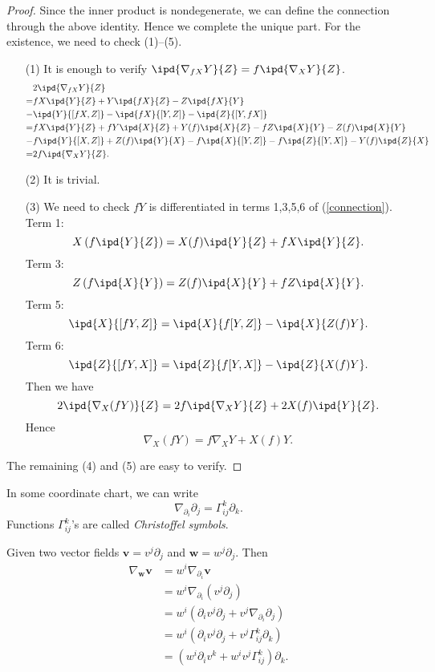 \begin{proof}
  Since the inner product is nondegenerate, we can define the connection through the above identity. Hence we complete the unique part. For the existence, we need to check (1)--(5). 
  \begin{itemize}
    \item [(1)] It is enough to verify $\ipd{\nabla _{fX}Y}{Z}=f\ipd{\nabla _{X}Y}{Z}$. 
      \begin{align*}
	& 2\ipd{\nabla _{fX}Y}{Z}\\
	= & fX\ipd{Y}{Z}+Y\ipd{fX}{Z}-Z\ipd{fX}{Y}\\
	- & \ipd{Y}{[fX,Z]}-\ipd{fX}{[Y,Z]}-\ipd{Z}{[Y,fX]}\\
	= & fX\ipd{Y}{Z}+fY\ipd{X}{Z}+Y(f) \ipd{X}{Z}-fZ\ipd{X}{Y}-Z(f)\ipd{X}{Y}\\
	- & f\ipd{Y}{[X,Z]}+Z(f)\ipd{Y}{X}-f\ipd{X}{[Y,Z]}-f\ipd{Z}{[Y,X]}-Y(f)\ipd{Z}{X}\\
	= & 2f \ipd{\nabla _XY}{Z}
      .\end{align*}
    \item [(2)] It is trivial.
    \item [(3)] We need to check $fY$ is differentiated in terms 1,3,5,6 of (\ref{connection}).\\
      Term 1:
      \[
	X\left( f\ipd{Y}{Z} \right) =X(f)\ipd{Y}{Z}+fX\ipd{Y}{Z}.
      \] 
      Term 3:
      \[
	Z\left( f\ipd{X}{Y} \right) =Z(f)\ipd{X}{Y}+fZ\ipd{X}{Y}.
      \] 
      Term 5:
      \[
	\ipd{X}{[fY,Z]}=\ipd{X}{f[Y,Z]}-\ipd{X}{Z(f)Y}.
      \] 
      Term 6:
      \[
	\ipd{Z}{[fY,X]}=\ipd{Z}{f[Y,X]}-\ipd{Z}{X(f)Y}.
      \]
      Then we have
      \[
	2\ipd{\nabla _X (fY)}{Z}=2f\ipd{\nabla _XY}{Z}+2X(f)\ipd{Y}{Z}.
      \]
      Hence 
      \[
	\nabla _X(fY)=f\nabla _XY+X(f)Y.
      \]
  \end{itemize}
  The remaining (4) and (5) are easy to verify.
\end{proof}
\begin{definition}
  In some coordinate chart, we can write
  \begin{equation}
    \nabla _{\partial_i}\partial_j=\Gamma^k_{ij}\partial_k.\label{chris}
\end{equation}
  Functions $\Gamma^k_{ij}$'s are called \textit{Christoffel symbols}. 
\end{definition}
Given two vector fields $\mathbf{v}=v^j\partial_j$ and $\mathbf{w}=w^j\partial_j$. Then 
\begin{align*}
  \nabla _{\mathbf{w}}\mathbf{v}&=w^i\nabla _{\partial_i}\mathbf{v}\\
&= w^i \nabla _{\partial_i}\left( v^j\partial_j \right) \\
& = w^i \left( \partial_i v^j \partial_j+v^j \nabla _{\partial_i}\partial_j \right) \\
& = w^i\left( \partial_i v^j\partial_j+v^j\Gamma^k_{ij}\partial_k \right) \\
&= \left( w^i \partial_i v^k+ w^i v^j\Gamma^k_{ij} \right) \partial_k
.\end{align*}
